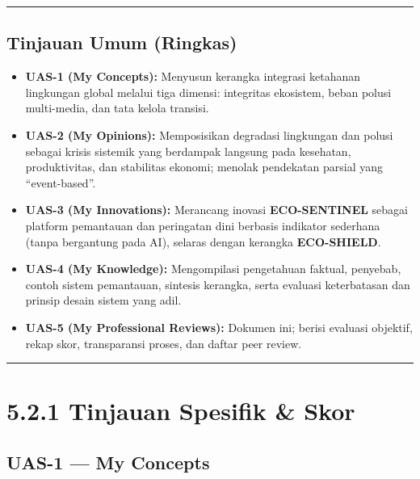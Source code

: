 \documentclass[
  letterpaper,
  DIV=11,
  numbers=noendperiod]{scrreprt}
\providecommand{\tightlist}{%
  \setlength{\itemsep}{0pt}\setlength{\parskip}{0pt}}
\begin{document}
\begin{center}\rule{0.5\linewidth}{0.5pt}\end{center}

\subsection{Tinjauan Umum (Ringkas)}\label{tinjauan-umum-ringkas}

\begin{itemize}
\tightlist
\item
  \textbf{UAS-1 (My Concepts):} Menyusun kerangka integrasi ketahanan
  lingkungan global melalui tiga dimensi: integritas ekosistem, beban
  polusi multi-media, dan tata kelola transisi.\\
\item
  \textbf{UAS-2 (My Opinions):} Memposisikan degradasi lingkungan dan
  polusi sebagai krisis sistemik yang berdampak langsung pada kesehatan,
  produktivitas, dan stabilitas ekonomi; menolak pendekatan parsial yang
  ``event-based''.\\
\item
  \textbf{UAS-3 (My Innovations):} Merancang inovasi
  \textbf{ECO-SENTINEL} sebagai platform pemantauan dan peringatan dini
  berbasis indikator sederhana (tanpa bergantung pada AI), selaras
  dengan kerangka \textbf{ECO-SHIELD}.\\
\item
  \textbf{UAS-4 (My Knowledge):} Mengompilasi pengetahuan faktual,
  penyebab, contoh sistem pemantauan, sintesis kerangka, serta evaluasi
  keterbatasan dan prinsip desain sistem yang adil.\\
\item
  \textbf{UAS-5 (My Professional Reviews):} Dokumen ini; berisi evaluasi
  objektif, rekap skor, transparansi proses, dan daftar peer review.
\end{itemize}

\begin{center}\rule{0.5\linewidth}{0.5pt}\end{center}

\section{5.2.1 Tinjauan Spesifik \& Skor}\label{tinjauan-spesifik-skor}

\subsection{UAS-1 --- My Concepts}\label{uas-1-my-concepts-1}
\end{document}
